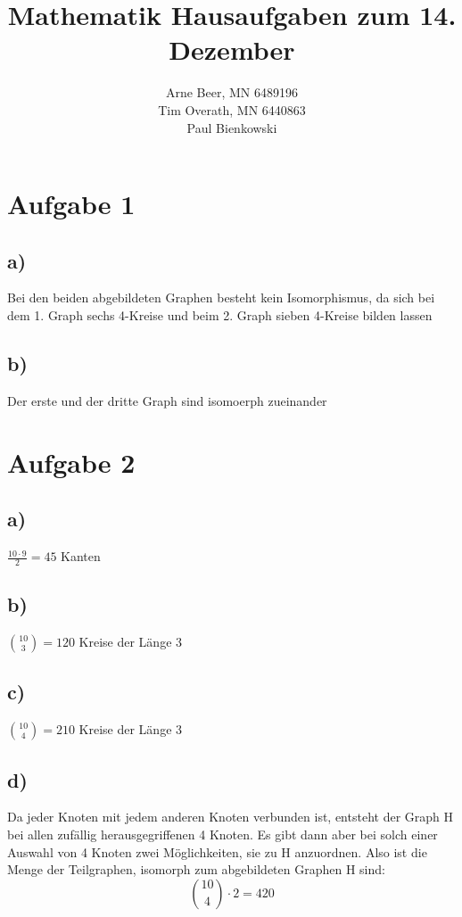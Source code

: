 \documentclass{article}
\title{Mathematik Hausaufgaben zum 14. Dezember}
\author{Arne Beer, MN 6489196 \\
 Tim Overath, MN 6440863\\
 Paul Bienkowski}
\begin{document}
\maketitle

\section*{Aufgabe 1}
	
	\subsection*{a)}
		Bei den beiden abgebildeten Graphen besteht kein Isomorphismus, da sich bei dem 1. Graph sechs 4-Kreise und beim 2. Graph sieben 4-Kreise bilden lassen

	\subsection*{b)}

		Der erste und der dritte Graph sind isomoerph zueinander

\section*{Aufgabe 2}
	\subsection*{a)}
		$\frac{10\cdot 9}{2}=45$ Kanten

	\subsection*{b)}
		$\binom{10}{3}=120$ Kreise der Länge 3

	\subsection*{c)}
		$\binom{10}{4}=210$ Kreise der Länge 3


	\subsection*{d)}
		Da jeder Knoten mit jedem anderen Knoten verbunden ist, entsteht der
		Graph H bei allen zufällig herausgegriffenen 4 Knoten. Es gibt dann aber bei
		solch einer Auswahl von 4 Knoten zwei Möglichkeiten, sie zu H anzuordnen.
		Also ist die Menge der Teilgraphen, isomorph zum abgebildeten Graphen H sind:
		\[\binom{10}{4}\cdot 2 = 420\]
\end{document}
